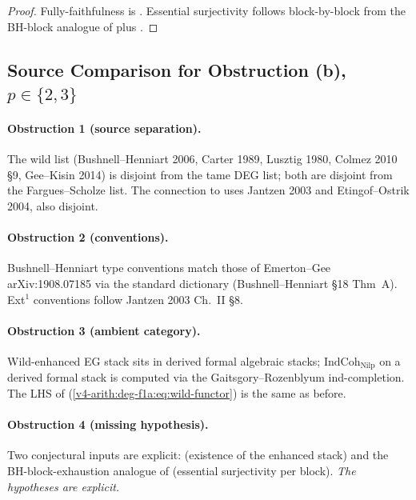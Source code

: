 \begin{proof}
Fully-faithfulness is .
Essential surjectivity follows block-by-block from the BH-block
analogue of 
plus .
\end{proof}

\subsection{Source Comparison for Obstruction (b), \texorpdfstring{\(p\in\{2,3\}\)}{p in {2,3}}}

\paragraph{Obstruction 1 (source separation).} The wild list
(Bushnell--Henniart 2006, Carter 1989, Lusztig 1980, Colmez 2010
\S 9, Gee--Kisin 2014) is disjoint from the tame DEG list; both
are disjoint from the Fargues--Scholze list. The connection to
 uses Jantzen 2003
and Etingof--Ostrik 2004, also disjoint.

\paragraph{Obstruction 2 (conventions).} Bushnell--Henniart type
conventions match those of Emerton--Gee arXiv:1908.07185 via the
standard dictionary (Bushnell--Henniart \S 18 Thm~A). Ext\({}^{1}\)
conventions follow Jantzen 2003 Ch.~II \S 8.

\paragraph{Obstruction 3 (ambient category).} Wild-enhanced EG stack
sits in derived formal algebraic stacks; \(\mathrm{IndCoh}_{\mathrm{Nilp}}\)
on a derived formal stack is computed via the Gaitsgory--Rozenblyum
ind-completion. The LHS of
(\ref{v4-arith:deg-f1a:eq:wild-functor}) is the same as before.

\paragraph{Obstruction 4 (missing hypothesis).} Two conjectural inputs
are explicit: 
(existence of the enhanced stack) and the BH-block-exhaustion
analogue of 
(essential surjectivity per block). \emph{The hypotheses are explicit.}

